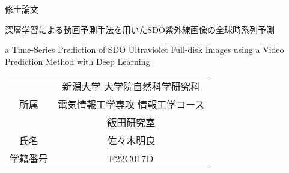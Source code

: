 \thispagestyle{empty} %

\begin{center}

    \vspace{2cm}
    
    {\Huge 修士論文}
    
    \vspace{2cm}
    
    {\LARGE 深層学習による動画予測手法を用いたSDO紫外線画像の全球時系列予測}
    
    \vspace{1cm}
    
    {\Large a Time-Series Prediction of SDO Ultraviolet Full-disk Images using a Video Prediction Method with Deep Learning}
    
    \vspace{3cm}
    
    \Large
    \begin{tabular}{|c|c|}
      \hline
      \multirow{3}{*}{所属} & 新潟大学 大学院自然科学研究科\\ &  電気情報工学専攻 情報工学コース \\ & 飯田研究室 \\
      \hline
      氏名 &  佐々木明良\\
      \hline
      学籍番号 & F22C017D\\
      \hline
    \end{tabular}
\end{center}

\clearpage %

